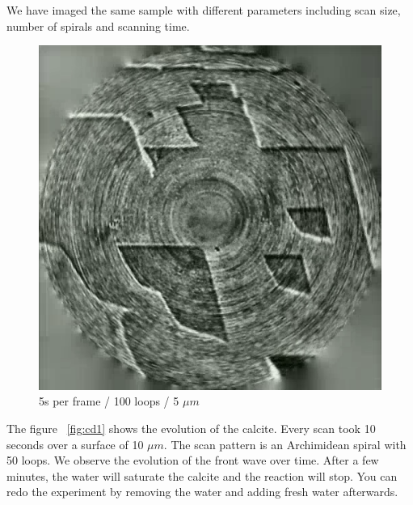 We have imaged the same sample with different parameters including scan size, number of spirals and scanning time.
\begin{figure}[H]
  \centering
  \includegraphics[scale=0.4]{images/calciteangle.png}
    \caption{5s per frame / 100 loops / 5 $\mu m$}
  \label{fig:calciteangle}
\end{figure}

The figure ~\ref{fig:cd1} shows the evolution of the calcite. Every scan took 10 seconds over a surface of 10 $\mu m$. The scan pattern is an Archimidean spiral with 50 loops. We observe the evolution of the front wave over time. After a few minutes, the water will saturate the calcite and the reaction will stop. You can redo the experiment by removing the water and adding fresh water afterwards.


